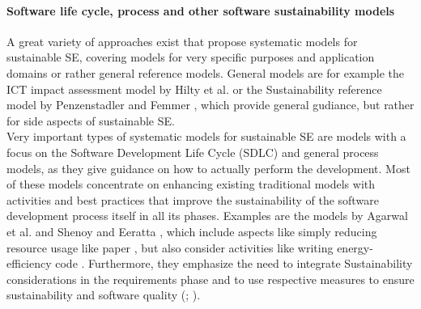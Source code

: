 \documentclass[oribibl]{llncs}
\begin{document}
\paragraph{Software life cycle, process and other software sustainability models}
A great variety of approaches exist that propose systematic models for sustainable SE, covering models for very specific purposes and application domains or rather general reference models. General models are for example the ICT impact assessment model by Hilty et al. \cite{hilty_relevance_2006} or the Sustainability reference model by Penzenstadler and Femmer \cite{penzenstadler_generic_2013}, which provide general gudiance, but rather for side aspects of sustainable SE.\\
Very important types of systematic models for sustainable SE are models with a focus on the Software Development Life Cycle (SDLC) and general process models, as they give guidance on how to actually perform the development. Most of these models concentrate on enhancing existing traditional models with activities and best practices that improve the sustainability of the software development process itself in all its phases. Examples are the models by Agarwal et al. \cite{agarwal_sustainable_2012} and Shenoy and Eeratta \cite{shenoy_green_2011}, which include aspects like simply reducing resource usage like paper \cite{shenoy_green_2011}, but also consider activities like writing energy-efficiency code \cite{agarwal_sustainable_2012}. Furthermore, they emphasize the need to integrate Sustainability considerations in the requirements phase and to use respective measures to ensure sustainability and software quality (\cite{agarwal_sustainable_2012}; \cite{shenoy_green_2011}).\\ %
\end{document}
